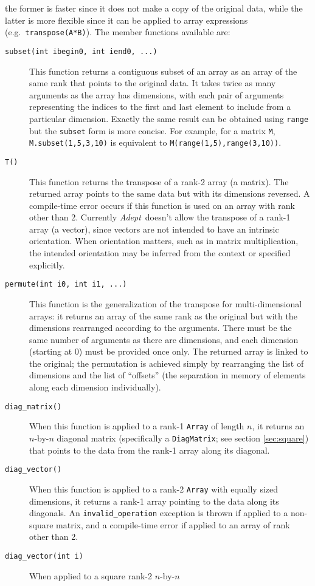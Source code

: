 \documentclass[a4,oneside]{book}
\def\codesize{\small}
\def\Adept{\emph{Adept}}
\def\code#1{{\codesize\texttt{#1}}}
\def\citem#1{\item[{\codesize\texttt{#1}}]}
\begin{document}
the former is faster since it does not make a copy of the original
data, while the latter is more flexible since it can be applied to
array expressions (e.g.\ \code{transpose(A*B)}).  The member functions
available are:
\begin{description}
\citem{subset(int ibegin0, int iend0, ...)} This function returns a
contiguous subset of an array as an array of the same rank that points
to the original data. It takes twice as many arguments as the array
has dimensions, with each pair of arguments representing the indices
to the first and last element to include from a particular
dimension. Exactly the same result can be obtained using \code{range}
but the \code{subset} form is more concise. For example, for a matrix
\code{M}, \code{M.subset(1,5,3,10)} is equivalent to
\code{M(range(1,5),range(3,10))}.
%
\citem{T()} This function returns the transpose of a rank-2 array (a
matrix). The returned array points to the same data but with its
dimensions reversed. A compile-time error occurs if this function is
used on an array with rank other than 2.  Currently \Adept\ doesn't
allow the transpose of a rank-1 array (a vector), since vectors are
not intended to have an intrinsic orientation.  When orientation
matters, such as in matrix multiplication, the intended orientation
may be inferred from the context or specified explicitly.
%
\citem{permute(int i0, int i1, ...)} This function is the
generalization of the transpose for multi-dimensional arrays: it
returns an array of the same rank as the original but with the
dimensions rearranged according to the arguments. There must be the
same number of arguments as there are dimensions, and each dimension
(starting at 0) must be provided once only. The returned array is
linked to the original; the permutation is achieved simply by
rearranging the list of dimensions and the list of ``offsets'' (the
separation in memory of elements along each dimension individually).
%
\citem{diag\_matrix()} When this function is applied to a rank-1
\code{Array} of length $n$, it returns an $n$-by-$n$ diagonal matrix
(specifically a \code{DiagMatrix}; see section \ref{sec:square}) that
points to the data from the rank-1 array along its diagonal.
%
\citem{diag\_vector()} When this function is applied to a rank-2
\code{Array} with equally sized dimensions, it returns a rank-1 array
pointing to the data along its diagonals.  An
\code{invalid\_operation} exception is thrown if applied to a
non-square matrix, and a compile-time error if applied to an array of
rank other than 2.
%
\citem{diag\_vector(int i)} When applied to a square rank-2 $n$-by-$n$

\end{description}
\end{document}
